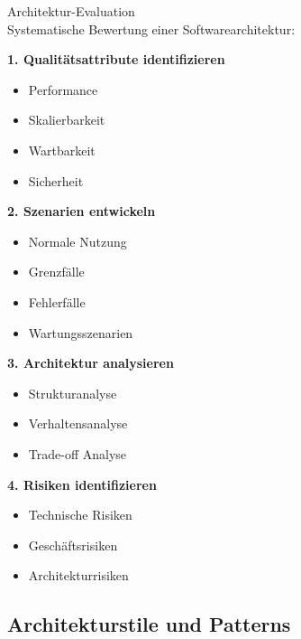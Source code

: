 \begin{KR}{Architektur-Evaluation}\\
Systematische Bewertung einer Softwarearchitektur:

\textbf{1. Qualitätsattribute identifizieren}
\begin{itemize}
    \item Performance
    \item Skalierbarkeit
    \item Wartbarkeit
    \item Sicherheit
\end{itemize}

\textbf{2. Szenarien entwickeln}
\begin{itemize}
    \item Normale Nutzung
    \item Grenzfälle
    \item Fehlerfälle
    \item Wartungsszenarien
\end{itemize}

\textbf{3. Architektur analysieren}
\begin{itemize}
    \item Strukturanalyse
    \item Verhaltensanalyse
    \item Trade-off Analyse
\end{itemize}

\textbf{4. Risiken identifizieren}
\begin{itemize}
    \item Technische Risiken
    \item Geschäftsrisiken
    \item Architekturrisiken
\end{itemize}
\end{KR}




\raggedcolumns
\pagebreak

\subsection{Architekturstile und Patterns}

